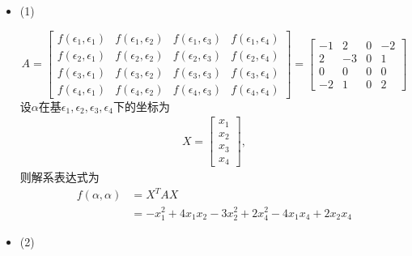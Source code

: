 \documentclass{article}
\begin{document}
\begin{itemize}
  \item (1)

        \[
          A =
          \begin{bmatrix}
            f(\epsilon_1, \epsilon_1) & f(\epsilon_1, \epsilon_2) & f(\epsilon_1, \epsilon_3) & f(\epsilon_1, \epsilon_4) \\
            f(\epsilon_2, \epsilon_1) & f(\epsilon_2, \epsilon_2) & f(\epsilon_2, \epsilon_3) & f(\epsilon_2, \epsilon_4) \\
            f(\epsilon_3, \epsilon_1) & f(\epsilon_3, \epsilon_2) & f(\epsilon_3, \epsilon_3) & f(\epsilon_3, \epsilon_4) \\
            f(\epsilon_4, \epsilon_1) & f(\epsilon_4, \epsilon_2) & f(\epsilon_4, \epsilon_3) & f(\epsilon_4, \epsilon_4)
          \end{bmatrix}
          =
          \begin{bmatrix}
            -1 & 2  & 0 & -2 \\
            2  & -3 & 0 & 1  \\
            0  & 0  & 0 & 0  \\
            -2 & 1  & 0 & 2
          \end{bmatrix}
        \]
        设$\alpha$在基$\epsilon_1, \epsilon_2, \epsilon_3, \epsilon_4$下的坐标为
        \begin{align*}
          X = \begin{bmatrix}
                x_1 \\
                x_2 \\
                x_3 \\
                x_4
              \end{bmatrix},
        \end{align*}
        则解系表达式为
        \begin{align*}
          f(\alpha, \alpha) & = X^T A X                                                         \\
                            & = - x_1^2 + 4 x_1 x_2 - 3 x_2^2 + 2 x_4^2 - 4 x_1 x_4 + 2 x_2 x_4
        \end{align*}

  \item (2)


\end{itemize}
\end{document}
